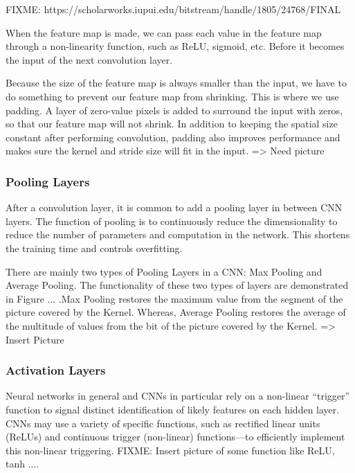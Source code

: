         FIXME: https://scholarworks.iupui.edu/bitstream/handle/1805/24768/FINAL%

        When the feature map is made, we can pass each value in
        the feature map through a non-linearity function, such as ReLU, sigmoid, etc. Before it
        becomes the input of the next convolution layer.

        Because the size of the feature map is always smaller than the input, we have 
        to do something to prevent our feature map from shrinking. This is where we use 
        padding. A layer of zero-value pixels is added to surround the input with zeros, 
        so that our feature map will not shrink. In addition to keeping the spatial 
        size constant after performing convolution, padding also improves performance 
        and makes sure the kernel and stride size will fit in the input. => Need picture
      \subsubsection{ Pooling Layers }
        After a convolution layer, it is common to add a pooling layer in between CNN layers. 
        The function of pooling is to continuously reduce the dimensionality to reduce the number 
        of parameters and computation in the network. This shortens the training time and controls 
        overfitting.

        There are mainly two types of Pooling Layers in a CNN: Max Pooling and Average
        Pooling. The functionality of these two types of layers are demonstrated in Figure
        ... .Max Pooling restores the maximum value from the segment of the picture covered
        by the Kernel. Whereas, Average Pooling restores the average of the multitude of
        values from the bit of the picture covered by the Kernel. => Insert Picture

      \subsubsection{ Activation Layers }
        Neural networks in general and CNNs in particular rely on a non-linear “trigger” function 
        to signal distinct identification of likely features on each hidden layer. CNNs may use a 
        variety of specific functions, such as rectified linear
        units (ReLUs) and continuous trigger (non-linear) functions—to efficiently implement this non-linear triggering.
        FIXME: Insert picture of some function like ReLU, tanh ....

